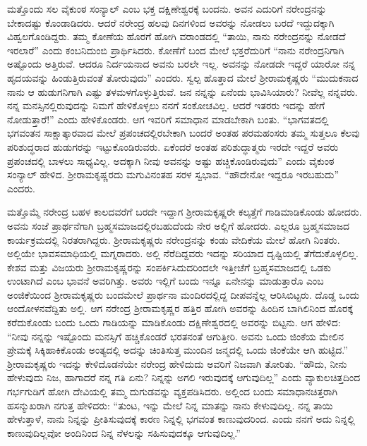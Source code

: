 ಮತ್ತೊಂದು ಸಲ ವೈಕುಂಠ ಸಂನ್ಯಾಲ್ ಎಂಬ ಭಕ್ತ ದಕ್ಷಿಣೇಶ್ವರಕ್ಕೆ ಬಂದನು. ಅವನ ಎದುರಿಗೆ ನರೇಂದ್ರನನ್ನು ಬೇಕಾದಷ್ಟು ಕೊಂಡಾಡಿದರು. ಆದರೆ ನರೇಂದ್ರ ಹಲವು ದಿನಗಳಿಂದ ಅವರನ್ನು ನೋಡಲು ಬರದೆ ಇದ್ದುದಕ್ಕಾಗಿ ವಿಹ್ವಲಗೊಂಡಿದ್ದರು. ತಮ್ಮ ಕೋಣೆಯ ಹೊರಗೆ ಹೋಗಿ ವರಾಂಡದಲ್ಲಿ “ತಾಯಿ, ನಾನು ನರೇಂದ್ರನನ್ನು ನೋಡದೆ ಇರಲಾರೆ” ಎಂದು ಕಂಬನಿದುಂಬಿ ಪ್ರಾರ್ಥಿಸಿದರು. ಕೋಣೆಗೆ ಬಂದ ಮೇಲೆ ಭಕ್ತರೆದುರಿಗೆ “ನಾನು ನರೇಂದ್ರನಿಗಾಗಿ ಅಷ್ಟೊಂದು ಅತ್ತಿರುವೆ. ಆದರೂ ನಿರ್ದಯನಾದ ಅವನು ಬರಲೇ ಇಲ್ಲ. ಅವನನ್ನು ನೋಡದೇ ಇದ್ದರೆ ಯಾರೋ ನನ್ನ ಹೃದಯವನ್ನು ಹಿಂಡುತ್ತಿರುವಂತೆ ತೋರುವುದು” ಎಂದರು. ಸ್ವಲ್ಪ ಹೊತ್ತಾದ ಮೇಲೆ ಶ‍್ರೀರಾಮಕೃಷ್ಣರು “ಮುದುಕನಾದ ನಾನು ಆ ಹುಡುಗನಿಗಾಗಿ ಎಷ್ಟು ತಳಮಳಗೊಳ್ಳುತ್ತಿರುವೆ. ಜನ ನನ್ನನ್ನು ಏನೆಂದು ಭಾವಿಸಿಯಾರು? ನೀವೆಲ್ಲ ನನ್ನವರು. ನನ್ನ ಮನಸ್ಸಿನಲ್ಲಿರುವುದನ್ನು ನಿಮಗೆ ಹೇಳಿಕೊಳ್ಳಲು ನನಗೆ ಸಂಕೋಚವಿಲ್ಲ. ಆದರೆ ಇತರರು ಇದನ್ನು ಹೇಗೆ ನೋಡುತ್ತಾರೆ!” ಎಂದು ಹೇಳಿಕೊಂಡರು. ಆಗ ಇವರಿಗೆ ಸಮಾಧಾನ ಮಾಡಬೇಕಾಗಿ ಬಂತು. “ಭಾಗವತದಲ್ಲಿ ಭಗವಂತನ ಸಾಕ್ಷಾತ್ಕಾರವಾದ ಮೇಲೆ ಪ್ರಪಂಚದಲ್ಲಿರಬೇಕಾಗಿ ಬಂದರೆ ಅಂತಹ ಪರಮಹಂಸರು ತಮ್ಮ ಸುತ್ತಲೂ ಕೆಲವು ಪರಿಶುದ್ಧರಾದ ಹುಡುಗರನ್ನು ಇಟ್ಟುಕೊಂಡಿರುವರು. ಏಕೆಂದರೆ ಅಂತಹ ಪರಿಶುದ್ಧಾತ್ಮರು ಇರದೇ ಇದ್ದರೆ ಅವರು ಪ್ರಪಂಚದಲ್ಲಿ ಬಾಳಲು ಸಾಧ್ಯವಿಲ್ಲ. ಅದಕ್ಕಾಗಿ ನೀವು ಅವನನ್ನು ಅಷ್ಟು ಹಚ್ಚಿಕೊಂಡಿರುವುದು” ಎಂದು ವೈಕುಂಠ ಸಂನ್ಯಾಲ್ ಹೇಳಿದ. ಶ‍್ರೀರಾಮಕೃಷ್ಣರದು ಮಗುವಿನಂತಹ ಸರಳ ಸ್ವಭಾವ. “ಹೌದೇನೋ ಇದ್ದರೂ ಇರಬಹುದು” ಎಂದರು.

\newpage

ಮತ್ತೊಮ್ಮೆ ನರೇಂದ್ರ ಬಹಳ ಕಾಲದವರೆಗೆ ಬರದೇ ಇದ್ದಾಗ ಶ‍್ರೀರಾಮಕೃಷ್ಣರೇ ಕಲ್ಕತ್ತೆಗೆ ಗಾಡಿಮಾಡಿಕೊಂಡು ಹೋದರು. ಅವನು ಸಂಜೆ ಪ್ರಾರ್ಥನೆಗಾಗಿ ಬ್ರಹ್ಮಸಮಾಜದಲ್ಲಿರಬಹುದೆಂದು ನೇರ ಅಲ್ಲಿಗೆ ಹೋದರು. ಎಲ್ಲರೂ ಬ್ರಹ್ಮಸಮಾಜದ ಕಾರ್ಯಕ್ರಮದಲ್ಲಿ ನಿರತರಾಗಿದ್ದರು. ಶ‍್ರೀರಾಮಕೃಷ್ಣರು ನರೇಂದ್ರನನ್ನು ಕಂಡು ವೇದಿಕೆಯ ಮೇಲೆ ಹೋಗಿ ನಿಂತರು. ಅಲ್ಲಿಯೇ ಭಾವಸಮಾಧಿಯಲ್ಲಿ ಮಗ್ನರಾದರು. ಅಲ್ಲಿ ನೆರೆದಿದ್ದವರು ಇದನ್ನು ಸರಿಯಾದ ದೃಷ್ಟಿಯಲ್ಲಿ ತೆಗೆದುಕೊಳ್ಳಲಿಲ್ಲ. ಕೇಶವ ಮತ್ತು ವಿಜಯರು ಶ‍್ರೀರಾಮಕೃಷ್ಣರನ್ನು ಸಂಪರ್ಕಿಸಿದುದರಿಂದಲೇ ಇತ್ತೀಚೆಗೆ ಬ್ರಹ್ಮಸಮಾಜದಲ್ಲಿ ಒಡಕು ಉಂಟಾಗಿದೆ ಎಂಬ ಭಾವನೆ ಅವರಿಗಿತ್ತು. ಅವರು ಇಲ್ಲಿಗೆ ಬಂದು ಇನ್ನೂ ಏನೇನನ್ನು ಮಾಡುತ್ತಾರೊ ಎಂಬ ಅಂಜಿಕೆಯಿಂದ ಶ‍್ರೀರಾಮಕೃಷ್ಣರು ಬಂದಮೇಲೆ ಪ್ರಾರ್ಥನಾ ಮಂದಿರದಲ್ಲಿದ್ದ ದೀಪವನ್ನೆಲ್ಲ ಆರಿಸಿಬಿಟ್ಟರು. ದೊಡ್ಡ ಒಂದು ಆಂದೋಳನವೆದ್ದಿತು ಅಲ್ಲಿ. ಆಗ ನರೇಂದ್ರ ಶ‍್ರೀರಾಮಕೃಷ್ಣರ ಹತ್ತಿರ ಹೋಗಿ ಅವರನ್ನು ಹಿಂದಿನ ಬಾಗಿಲಿನಿಂದ ಹೊರಕ್ಕೆ ಕರೆದುಕೊಂಡು ಬಂದು ಒಂದು ಗಾಡಿಯನ್ನು ಮಾಡಿಕೊಂಡು ದಕ್ಷಿಣೇಶ್ವರದಲ್ಲಿ ಅವರನ್ನು ಬಿಟ್ಟನು. ಆಗ ಹೇಳಿದ: “ನೀವು ನನ್ನನ್ನು ಇಷ್ಟೊಂದು ಮನಸ್ಸಿಗೆ ಹಚ್ಚಿಕೊಂಡರೆ ಭರತನಂತೆ ಆಗುತ್ತೀರಿ. ಅವನು ಒಂದು ಜಿಂಕೆಯ ಮೇಲಿನ ಪ್ರೇಮಕ್ಕೆ ಸಿಕ್ಕಿಹಾಕಿಕೊಂಡು ಅಂತ್ಯದಲ್ಲಿ ಅದನ್ನು ಚಿಂತಿಸುತ್ತ ಮುಂದಿನ ಜನ್ಮದಲ್ಲಿ ಒಂದು ಜಿಂಕೆಯೇ ಆಗಿ ಹುಟ್ಟಿದ.” ಶ‍್ರೀರಾಮಕೃಷ್ಣರು ಇದನ್ನು ಕೇಳಿದೊಡನೆಯೇ ನರೇಂದ್ರ ಹೇಳಿದುದು ಅವರಿಗೆ ನಿಜವಾಗಿ ತೋರಿತು. “ಹೌದು, ನೀನು ಹೇಳುವುದು ನಿಜ, ಹಾಗಾದರೆ ನನ್ನ ಗತಿ ಏನು? ನಿನ್ನನ್ನು ಅಗಲಿ ಇರುವುದಕ್ಕೆ ಆಗುವುದಿಲ್ಲ” ಎಂದು ವ್ಯಾಕುಲಚಿತ್ತದಿಂದ ಗರ್ಭಗುಡಿಗೆ ಹೋಗಿ ದೇವಿಯಲ್ಲಿ ತಮ್ಮ ದುಗುಡವನ್ನು ವ್ಯಕ್ತಪಡಿಸಿದರು. ಅಲ್ಲಿಂದ ಬಂದು ಸಮಾಧಾನಚಿತ್ತರಾಗಿ ಹಸನ್ಮುಖರಾಗಿ ನಗುತ್ತ ಹೇಳಿದರು: “ತುಂಟ, ಇನ್ನು ಮೇಲೆ ನಿನ್ನ ಮಾತನ್ನು ನಾನು ಕೇಳುವುದಿಲ್ಲ. ನನ್ನ ತಾಯಿ ಹೇಳುತ್ತಾಳೆ, ನಾನು ನಿನ್ನನ್ನು ಪ್ರೀತಿಸುವುದಕ್ಕೆ ಕಾರಣ ನಿನ್ನಲ್ಲಿ ಭಗವಂತ ಕಾಣುವುದರಿಂದ. ಎಂದು ನನಗೆ ಅದು ನಿನ್ನಲ್ಲಿ ಕಾಣುವುದಿಲ್ಲವೋ ಅಂದಿನಿಂದ ನಿನ್ನ ನೆಳಲನ್ನು ಸಹಿಸುವುದಕ್ಕೂ ಆಗುವುದಿಲ್ಲ.”

